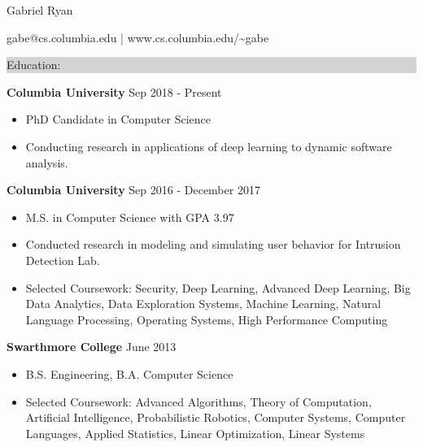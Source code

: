 \documentclass{article} %
\newcommand{\rsection}[1]{
\hspace{-0.4cm}
\colorbox{lightgrey}{
\begin{minipage}{1.07\linewidth}
\vspace{0.25cm}
\fontsize{14pt}{16pt}\selectfont #1 
\vspace{0.15cm}
\end{minipage}
}
\vspace*{-0.2cm}
}
\newcommand{\rjob}[2]{
\vspace{0.1cm}
\hspace*{-0.3cm}  
{\fontsize{10pt}{12pt}\selectfont #1} \hfill #2 
\vspace*{0.1cm} 
\hspace*{-1.2cm}
}
\newenvironment{ritemize}{
\hspace*{-0.8cm} 
\begin{minipage}{1.05\linewidth}
\begin{itemize}
}{
\end{itemize}
\end{minipage}
\vspace{-0.2cm}
}
\newcommand{\ritem}{
\item[-]
}
\begin{document}
\hspace*{-0.45cm} 
{\fontsize{22pt}{22pt}\selectfont Gabriel Ryan}\\
\begin{minipage}{\linewidth}
\vspace{0.1cm}
  {\fontsize{12}{12}\selectfont
    gabe@cs.columbia.edu | www.cs.columbia.edu/\textasciitilde gabe
  }
\end{minipage}
\vspace{-0.15cm}


\rsection{Education:} 

\rjob{\textbf{Columbia University}}{Sep 2018 - Present}\\
\begin{ritemize}
\ritem PhD Candidate in Computer Science
\ritem Conducting research in applications of deep learning to dynamic software analysis.
\end{ritemize}

\rjob{\textbf{Columbia University}}{Sep 2016 - December 2017}\\
\begin{ritemize}
\ritem M.S. in Computer Science with GPA 3.97
\ritem Conducted research in modeling and simulating user behavior for Intrusion Detection Lab.
\ritem Selected Coursework: Security, Deep Learning, Advanced Deep Learning, Big Data Analytics, Data Exploration Systems, Machine Learning, Natural Language Processing, Operating Systems, High Performance Computing
\end{ritemize}

\rjob{\textbf{Swarthmore College}}{June 2013}\\
\begin{ritemize}
\ritem B.S. Engineering, B.A. Computer Science
\ritem Selected Coursework: Advanced Algorithms, Theory of Computation, Artificial Intelligence, Probabilistic Robotics, Computer Systems, Computer Languages, Applied Statistics, Linear Optimization, Linear Systems
\end{ritemize}
\vspace{0.25cm}
\end{document}
